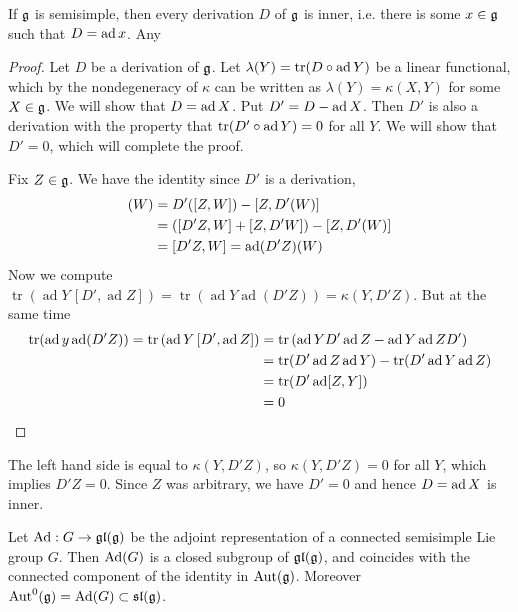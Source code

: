\documentclass[12pt]{article}
\begin{document}
\begin{theorem}
    If $\mathfrak{g}$ is semisimple, then every derivation $D$ of $\mathfrak{g}$ is inner, i.e. there is some $x \in \mathfrak{g}$ such that $D = \operatorname{ad} x$. Any
\end{theorem}

\begin{proof}
    Let $D$ be a derivation of $\mathfrak{g}$. Let $\lambda(Y) = \operatorname{tr}(D \circ \operatorname{ad} Y)$ be a linear functional, which by the nondegeneracy of $\kappa$ can be written as $\lambda(Y) = \kappa(X,Y)$ for some $X \in \mathfrak{g}$. We will show that $D = \operatorname{ad} X$. Put $D' = D - \operatorname{ad} X$. Then $D'$ is also a derivation with the property that $\operatorname{tr}(D' \circ \operatorname{ad} Y) = 0$ for all $Y$. We will show that $D' = 0$, which will complete the proof.

    Fix $Z\in \mathfrak{g}$. We have the identity since $D'$ is a derivation, \begin{align*}
        [D', \ad Z](W) & = D'([Z,W]) - [Z, D'(W)]           \\
                       & = ([D'Z,W] + [Z,D'W]) - [Z, D'(W)] \\
                       & = [D'Z,W] = \ad(D'Z)(W)
    \end{align*} Now we compute $\operatorname{tr}\left(\operatorname{ad}Y\,[D',\operatorname{ad}Z]\right) = \operatorname{tr}(\operatorname{ad}Y\operatorname{ad}(D'Z)) = \kappa(Y,D'Z)$. But at the same time \begin{align*}
        \operatorname{tr}(\operatorname{ad} y \operatorname{ad}(D'Z)) = \operatorname{tr}\left(\operatorname{ad}Y\,[D',\operatorname{ad}Z]\right)
         & =
        \operatorname{tr}\left(\operatorname{ad}Y D'\operatorname{ad}Z-\operatorname{ad}Y\operatorname{ad}Z D'\right) \\
         & = \operatorname{tr}(D' \operatorname{ad} Z  \operatorname{ad} Y) - \operatorname{tr}(D'  \operatorname{ad} Y  \operatorname{ad} Z)                                                             \\
         & = \operatorname{tr}(D' \operatorname{ad}[Z,Y])                                                                                         \\
         & = 0
    \end{align*}
\end{proof}
The left hand side is equal to $\kappa(Y,D'Z)$, so $\kappa(Y,D'Z) = 0$ for all $Y$, which implies $D'Z = 0$. Since $Z$ was arbitrary, we have $D' = 0$ and hence $D = \operatorname{ad} X$ is inner.

\begin{theorem}
    Let $\operatorname{Ad}: G\to \operatorname{\mathfrak{gl}}(\mathfrak g)$ be the adjoint representation of a connected semisimple Lie group $G$. Then $\operatorname{Ad}(G)$ is a closed subgroup of $\operatorname{\mathfrak{gl}}(\mathfrak g)$, and coincides with the connected component of the identity in $\operatorname{Aut}(\mathfrak g)$. Moreover $\operatorname{Aut}^0(\mathfrak g) = \operatorname{Ad}(G) \subset \mathfrak{sl}(\mathfrak g)$.
\end{theorem}
\end{document}
